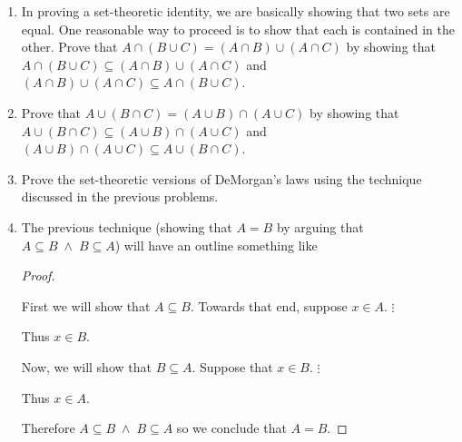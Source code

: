 \documentclass[10pt,]{book}
\theoremstyle{plain}
\theoremstyle{definition}
\theoremstyle{definition}
\numberwithin{equation}{section}
\newcommand{\hint}[1]{ }
\begin{document}
\begin{enumerate}[label=(\alph*)]
        \hint{One of the answers to the last two questions is \(\emptyset\) and the other is \(U\).  Decide
        which is which.}
\item\hypertarget{li-333}{}
        In proving a set-theoretic identity, we are basically showing that
        two sets are equal.  One reasonable way to proceed is to show that
        each is contained in the other.  Prove that 
        \(A \cap (B \cup C) = (A \cap B) \cup (A \cap C)\) by showing that 
        \(A \cap (B \cup C) \subseteq (A \cap B) \cup (A \cap C)\) and 
        \((A \cap B) \cup (A \cap C) \subseteq A \cap (B \cup C)\).
\item\hypertarget{li-334}{}
        Prove that 
        \(A \cup (B \cap C) = (A \cup B) \cap (A \cup C)\) by showing that 
        \(A \cup (B \cap C) \subseteq (A \cup B) \cap (A \cup C)\) and 
        \((A \cup B) \cap (A \cup C) \subseteq A \cup (B \cap C)\).

        \hint{This exercise, as well as the previous one, is really just about converting set-theoretic
        statements into their logical equivalents, applying some rules of logic that we've already verified,
        and then returning to a set-theoretic version of things.}
\item\hypertarget{li-335}{}
        Prove the set-theoretic versions of DeMorgan's laws using the technique
        discussed in the previous problems.
\item\hypertarget{li-336}{}
      The previous technique (showing that \(A=B\) by arguing that
      \(A \subseteq B \; \land \; B \subseteq A\)) will have an outline something like

      \begin{proof}\hypertarget{proof-25}{}

          First we will show that \(A \subseteq B\).
          Towards that end, suppose \(x \in A\).
\(\vdots\)\par

          Thus \(x \in B\).
\par

          Now, we will show that \(B \subseteq A\).
          Suppose that \(x \in B\).
\(\vdots\)\par

          Thus \(x \in A\).
\par

          Therefore \(A \subseteq B \; \land \; B \subseteq A\) so we conclude that \(A=B\).
\end{proof}



\end{enumerate}
\end{document}
